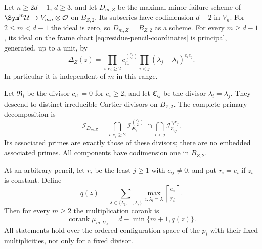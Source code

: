 \begin{theorem}
\label{thm:contact-pencil-primary}
Let $n\ge2d-1$, $d\ge3$, and let $D_{m,Z}$ be the maximal-minor
failure scheme of $\Sym^m\mathcal U\to V_{mn}\otimes\mathcal O$
on $B_{Z,2}$. Its subseries have codimension $d-2$ in $V_n$.
For $2\le m<d-1$ the ideal is zero, so $D_{m,Z}=B_{Z,2}$ as a
scheme. For every $m\ge d-1$, its ideal on the frame chart
\eqref{eq:residue-pencil-coordinates} is principal, generated, up
to a unit, by
\begin{equation}\label{eq:contact-index-form}
 \Delta_Z(z)=
 \prod_{i:e_i\ge2}c_{i1}^{\binom{e_i}{2}}
 \prod_{i<j}(\lambda_j-\lambda_i)^{e_i e_j}.
\end{equation}
In particular it is independent of $m$ in this range.

Let $\mathfrak R_i$ be the divisor $c_{i1}=0$ for $e_i\ge2$,
and let $\mathfrak C_{ij}$ be the divisor $\lambda_i=\lambda_j$.
They descend to distinct irreducible Cartier divisors on $B_{Z,2}$.
The complete primary decomposition is
\begin{equation}\label{eq:contact-primary-decomposition}
 \mathcal I_{D_{m,Z}}
 =\bigcap_{i:e_i\ge2}\mathcal I_{\mathfrak R_i}^{\binom{e_i}{2}}
   \ \cap\!\bigcap_{i<j}\mathcal I_{\mathfrak C_{ij}}^{e_i e_j}.
\end{equation}
Its associated primes are exactly those of these divisors; there
are no embedded associated primes. All components have codimension
one in $B_{Z,2}$.

At an arbitrary pencil, let $r_i$ be the least $j\ge1$ with
$c_{ij}\ne0$, and put $r_i=e_i$ if $z_i$ is constant. Define
\begin{equation}\label{eq:contact-minimal-polynomial-degree}
 q(z)=\sum_{\lambda\in\{\lambda_1,\ldots,\lambda_r\}}
          \max_{i:\lambda_i=\lambda}
                         \left\lceil\frac{e_i}{r_i}\right\rceil.
\end{equation}
Then for every $m\ge2$ the multiplication corank is
\begin{equation}\label{eq:contact-all-coranks}
 \operatorname{corank}\mu_{m,U_A}=d-\min\{m+1,q(z)\}.
\end{equation}
All statements hold over the ordered configuration space of the
$p_i$ with their fixed multiplicities, not only for a fixed divisor.
\end{theorem}

